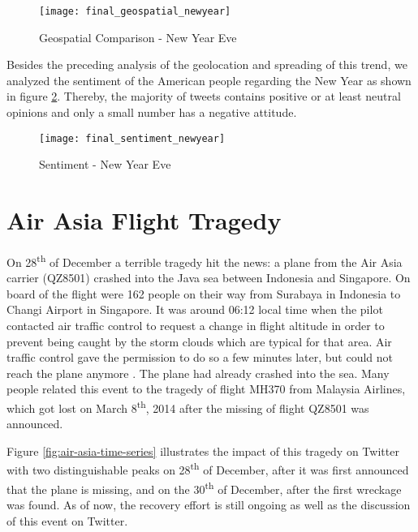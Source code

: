 \begin{figure}[H]
  \centering
        \texttt{[image: final\_geospatial\_newyear]}
  \caption[Geospatial Comparison - New Year Eve]{Geospatial Comparison - New Year Eve}
  \label{fig:new-year-heat-map}
  \vspace{-1.3em}
\end{figure}

Besides the preceding analysis of the geolocation and spreading of this trend, we analyzed the sentiment of the American people regarding the New Year as shown in figure \ref{fig:new-year-sentiment}. Thereby, the majority of tweets contains positive or at least neutral opinions and only a small number has a negative attitude.

\begin{figure}[H]
  \centering
        \texttt{[image: final\_sentiment\_newyear]}
  \caption[Sentiment - New Year Eve]{Sentiment - New Year Eve}
  \label{fig:new-year-sentiment}
  \vspace{-1.3em}
\end{figure}


\section{Air Asia Flight Tragedy}
\label{sec:air-asia-flight-tragedy}
On 28\textsuperscript{th} of December a terrible tragedy hit the news: a plane from the Air Asia carrier (QZ8501) crashed into the Java sea between Indonesia and Singapore. On board of the flight were 162 people on their way from Surabaya in Indonesia to Changi Airport in Singapore. It was around 06:12 local time when the pilot contacted air traffic control to request a change in flight altitude in order to prevent being caught by the storm clouds which are typical for that area. Air traffic control gave the permission to do so a few minutes later, but could not reach the plane anymore \cite{bbc2014flight}. The plane had already crashed into the sea. Many people related this event to the tragedy of flight MH370 from Malaysia Airlines, which got lost on March 8\textsuperscript{th}, 2014 \cite{nbc2014by} after the missing of flight QZ8501 was announced.

Figure \ref{fig:air-asia-time-series} illustrates the impact of this tragedy on Twitter with two distinguishable peaks on 28\textsuperscript{th} of December, after it was first announced that the plane is missing, and on the 30\textsuperscript{th} of December, after the first wreckage was found. As of now, the recovery effort is still ongoing as well as the discussion of this event on Twitter.

